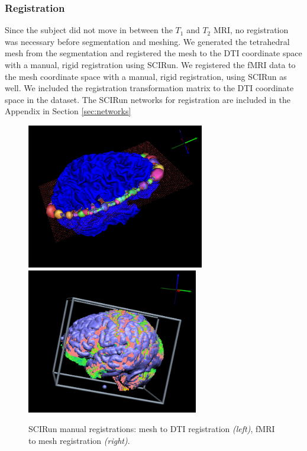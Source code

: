\subsubsection{Registration}
\label{sec:reg}

Since the subject did not move in between the $T_1$ and $T_2$ MRI, no registration was necessary before segmentation and meshing. We generated the tetrahedral mesh from the segmentation and registered the mesh to the DTI coordinate space with a manual, rigid registration using SCIRun. We registered the fMRI data to the mesh coordinate space with a manual, rigid registration, using SCIRun as well. We included the registration transformation matrix to the DTI coordinate space in the dataset. The SCIRun networks for registration are included in the Appendix in Section \ref{sec:networks}

\begin{figure}[H]
\begin{center}
\includegraphics[height = 2.5in]{Figures/DTI_reg}
\includegraphics[height = 2.5in]{Figures/fmri_reg}
\caption{SCIRun manual registrations: mesh to DTI registration \textit{(left)}, fMRI to mesh registration \textit{(right)}.}
\label{fig:dtireg}
\end{center}
\end{figure}

